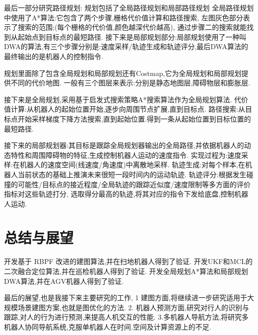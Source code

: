最后一部分研究路径规划:
规划包括了全局路径规划和局部路径规划
全局路径规划中使用了A*算法:它包含了两个步骤,栅格代价值计算和路径搜索,
左图灰色部分表示了搜索的范围;(每个栅格的代价值,颜色越深代价越高),
通过步骤二的搜索就能找到从起始点到目标点的最短路径.
接下来是局部规划部分:局部规划使用了一种叫DWA的算法,有三个步骤分别是:速度采样/轨迹生成和轨迹评分,最后DWA算法的最终输出的是机器人的控制指令.

规划里面除了包含全局规划和局部规划还有Costmap,它为全局规划和局部规划提供不同的代价地图.
一般有三个图层来表示:分别是静态地图层,障碍物层和膨胀层.

接下来是全局规划,采用基于启发式搜索策略A*搜索算法作为全局规划算法.
代价值计算:从机器人的起始位置开始,逐步向周围节点扩展,直到目标点.
路径搜索:从目标点开始采样梯度下降方法搜索,直到起始位置.得到一条从起始位置到目标位置的最短路径.

接下来的局部规划器:其目标是跟踪全局规划器输出的全局路径,并依据机器人的动态特性和周围障碍物的特征,生成控制机器人运动的速度指令.
实现过程为:速度采样:在机器人的速度空间(线速度/角速度)中离散地采样.
轨迹生成:对每个样本,在机器人当前状态的基础上推演未来很短一段时间内的运动轨迹. 
轨迹评分:根据发生碰撞的可能性/目标点的接近程度/全局轨迹的跟踪近似度/速度限制等多方面的评价指标对这些轨迹打分,
			选取得分最高的轨迹,将其对应的指令下发给底盘,控制机器人运动.







\section{总结与展望}

开发基于 RBPF 改进的建图算法,并在扫地机器人得到了验证.
开发UKF和MCL的二次融合定位算法,并在巡检机器人得到了验证.
开发全局规划A*算法和局部规划DWA算法,并在AGV机器人得到了验证.

最后的展望,也是我接下来主要研究的工作,
1 建图方面,将继续进一步研究适用于大规模场景建图方案,也就是图优化的方法.
2. 机器人预测方面,研究对行人的识别与跟踪,对人的行为进行预测,来提高人机交互的性能.
3.多机器人导航方法,将研究多机器人协同导航系统,克服单机器人在时间.空间及计算资源上的不足.
